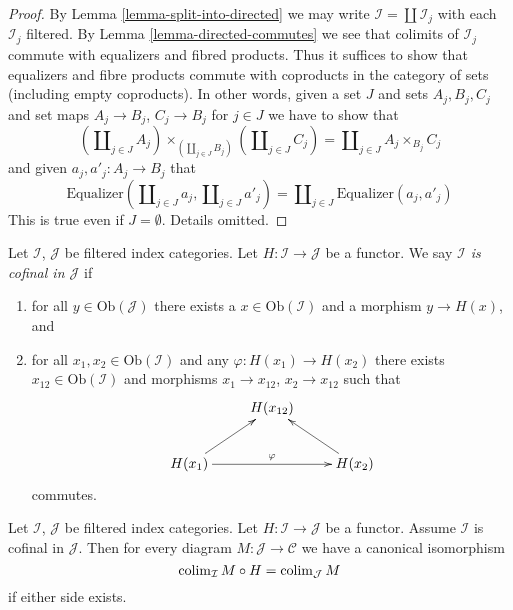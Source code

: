 \begin{proof}
By
Lemma \ref{lemma-split-into-directed}
we may write $\mathcal{I} = \coprod \mathcal{I}_j$ with each $\mathcal{I}_j$
filtered. By
Lemma \ref{lemma-directed-commutes}
we see that colimits of $\mathcal{I}_j$ commute with equalizers and
fibred products. Thus it suffices to show that equalizers and fibre products
commute with coproducts in the category of sets (including empty coproducts).
In other words, given a set $J$ and sets $A_j, B_j, C_j$ and set maps
$A_j \to B_j$, $C_j \to B_j$ for $j \in J$ we have to show that
$$
(\coprod\nolimits_{j \in J} A_j)
\times_{(\coprod\nolimits_{j \in J} B_j)}
(\coprod\nolimits_{j \in J} C_j)
=
\coprod\nolimits_{j \in J} A_j \times_{B_j} C_j
$$
and given $a_j, a'_j : A_j \to B_j$ that
$$
\text{Equalizer}(
\coprod\nolimits_{j \in J} a_j,
\coprod\nolimits_{j \in J} a'_j)
=
\coprod\nolimits_{j \in J}
\text{Equalizer}(a_j, a'_j)
$$
This is true even if $J = \emptyset$. Details omitted.
\end{proof}

\begin{definition}
\label{definition-cofinal-filtered}
Let $\mathcal{I}$, $\mathcal{J}$ be filtered index categories.
Let $H : \mathcal{I} \to \mathcal{J}$ be a functor. We say
{\it $\mathcal{I}$ is cofinal in $\mathcal{J}$} if
\begin{enumerate}
\item for all $y \in \text{Ob}(\mathcal{J})$ there exists a
$x \in \text{Ob}(\mathcal{I})$ and a morphism $y \to H(x)$, and
\item for all $x_1, x_2 \in \text{Ob}(\mathcal{I})$ and any
$\varphi : H(x_1) \to H(x_2)$ there exists $x_{12} \in \text{Ob}(\mathcal{I})$
and morphisms $x_1 \to x_{12}$, $x_2 \to x_{12}$ such that
$$
\xymatrix{
& H(x_{12}) & \\
H(x_1) \ar[rr]^\varphi \ar[ru] & & H(x_2) \ar[lu]
}
$$
commutes.
\end{enumerate}
\end{definition}

\begin{lemma}
\label{lemma-cofinal-filtered}
Let $\mathcal{I}$, $\mathcal{J}$ be filtered index categories.
Let $H : \mathcal{I} \to \mathcal{J}$ be a functor. Assume
$\mathcal{I}$ is cofinal in $\mathcal{J}$. Then for every diagram
$M : \mathcal{J} \to \mathcal{C}$ we have a canonical isomorphism
$$
\mathop{\rm colim}\nolimits_\mathcal{I} M \circ H
=
\mathop{\rm colim}\nolimits_\mathcal{J} M
$$
if either side exists.
\end{lemma}

